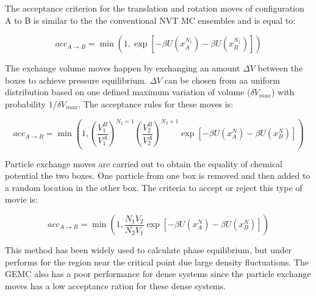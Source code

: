 The acceptance criterion for the translation and rotation moves of configuration A	to B is similar to the the conventional NVT MC ensembles and is equal to:

\begin{equation}
acc_{A \rightarrow B} = \min(1,\exp[-\beta U(x_{A}^{N_{1}}) -\beta U(x_{B}^{N_{1}})])
\label{eqn:drprob}
\end{equation} 

The exchange volume moves happen by exchanging an amount $\Delta V$ between the boxes to achieve pressure equilibrium. $\Delta V$ can be chosen from aa uniform distribution based on one defined maximum variation of volume ($\delta V_{max}$) with probability $1/\delta V_{max}$. The acceptance rules for these moves is: 

\begin{equation}
acc_{A \rightarrow B} = \min \left(1, \left(\dfrac{V_{1}^{B}}{V_{1}^{A}} \right)^{N_{1}=1} \left( \dfrac{V_{2}^{B}}{V_{2}^{A}} \right)^{N_{2}+1} \exp[-\beta U(x_{A}^{N}) -\beta U(x_{B}^{N})] \right)
\label{vprob}
\end{equation}

Particle exchange moves are carried out to obtain the equality of chemical potential the two boxes. One particle from one box is removed and then added to a random location in the other box. The criteria to accept or reject this type of movie is:

\begin{equation}
acc_{A \rightarrow B} = \min \left( 1, \dfrac{N_{1}V_{2}}{N_{2}V_{1}}  \exp[-\beta U(x_{A}^{N}) -\beta U(x_{B}^{N})] \right)
\label{moleprob}
\end{equation}

This method has been widely used to calculate phase equilibrium, but under performs for the region near the critical point due large density fluctuations. The GEMC also has a poor performance for dense systems since the particle exchange moves has a low acceptance ration for these dense systems.  


